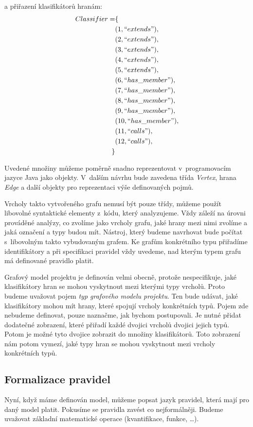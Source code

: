 a přiřazení klasifikátorů hranám:
\begin{align*}
  Classifier = &\{ \\
  &(1, ``extends"), \\
  &(2, ``extends"), \\
  &(3, ``extends"), \\
  &(4, ``extends"), \\
  &(5, ``extends"), \\
  &(6, ``has\_member"), \\
  &(7, ``has\_member"), \\
  &(8, ``has\_member"), \\
  &(9, ``has\_member"), \\
  &(10, ``has\_member"), \\
  &(11, ``calls"), \\
  &(12, ``calls"), \\
  \}
\end{align*}

Uvedené množiny můžeme poměrně snadno reprezentovat v~programovacím jazyce Java jako objekty. V~dalším návrhu bude zavedena třída \emph{Vertex}, hrana \emph{Edge} a další objekty pro reprezentaci výše definovaných pojmů.

Vrcholy takto vytvořeného grafu nemusí být pouze třídy, můžeme použít libovolné syntaktické elementy z~kódu, který analyzujeme. Vždy záleží na úrovni prováděné analýzy, co zvolíme jako vrcholy grafu, jaké hrany mezi nimi zvolíme a jaká označení a typy budou mít. Nástroj, který budeme navrhovat bude počítat s~libovolným takto vybudovaným grafem. Ke grafům konkrétního typu přiřadíme identifikátory a při specifikaci pravidel vždy uvedeme, nad kterým typem grafu má definované pravidlo platit.

Grafový model projektu je definován velmi obecně, protože nespecifikuje, jaké klasifikátory hran se mohou vyskytnout mezi kterými typy vrcholů. Proto budeme uvažovat pojem \emph{typ grafového modelu projektu}. Ten bude udávat, jaké klasifikátory mohou mít hrany, které spojují vrcholy konkrétních typů. Pojem zde nebudeme definovat, pouze naznačme, jak bychom postupovali. Je nutné přidat dodatečné zobrazení, které přiřadí každé dvojici vrcholů dvojici jejich typů. Potom je možné tyto dvojice zobrazit do množiny klasifikátorů. Toto zobrazení nám potom vymezí, jaké typy hran se mohou vyskytnout mezi vrcholy konkrétních typů.

\subsection{Formalizace pravidel}
\label{design-rules_formalization}
Nyní, když máme definován model, můžeme popsat jazyk pravidel, která mají pro daný model platit. Pokusíme se pravidla zavést co nejformálněji. Budeme uvažovat základní matematické operace (kvantifikace, funkce, \ldots).

